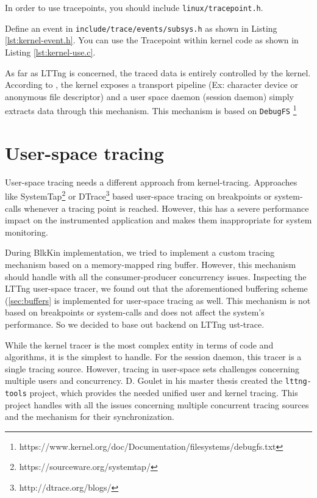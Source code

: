 In order to use tracepoints, you should include \texttt{linux/tracepoint.h}.

Define an event in \texttt{include/trace/events/subsys.h} as shown in Listing
\ref{lst:kernel-event.h}. You can use the Tracepoint within kernel code as shown
in Listing \ref{lst:kernel-use.c}.


As far as LTTng is concerned, the traced data is entirely controlled by the
kernel. According to \cite{desnoyer}, the kernel exposes a transport pipeline
(Ex: character device or anonymous file descriptor) and a user space daemon
(session daemon) simply extracts data through this mechanism. This mechanism is
based on \texttt{DebugFS}
\footnote{https://www.kernel.org/doc/Documentation/filesystems/debugfs.txt}

\section{User-space tracing}\label{sec:user-tracing}

User-space tracing needs a different approach from kernel-tracing. Approaches
like SystemTap\footnote{https://sourceware.org/systemtap/} or
DTrace\footnote{http://dtrace.org/blogs/} based user-space tracing on
breakpoints or system-calls whenever a tracing point is reached. However, this
has a severe performance impact on the instrumented application and makes them
inappropriate for system monitoring. 

During BlkKin implementation, we tried to implement a custom tracing mechanism
based on a memory-mapped ring buffer. However, this mechanism should handle with
all the consumer-producer concurrency issues. Inspecting the LTTng user-space
tracer, we found out that the aforementioned buffering scheme (\ref{sec:buffers}
is implemented for user-space tracing as well. This mechanism is not based on
breakpoints or system-calls and does not affect the system's performance. So we
decided to base out backend on LTTng ust-trace. 

While the kernel tracer is the most complex entity in terms of code and
algorithms, it is the simplest to handle. For the session daemon, this tracer is
a single tracing source. However, tracing in user-space sets challenges
concerning multiple users and concurrency. D. Goulet in his master thesis
\cite{goulet} created the \texttt{lttng-tools} project, which provides the
needed unified user and kernel tracing. This project handles with all the issues
concerning multiple concurrent tracing sources and the mechanism for their
synchronization.

